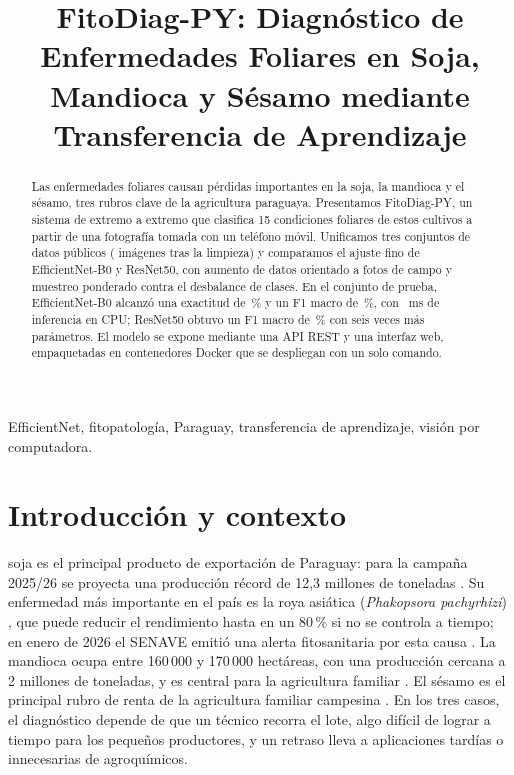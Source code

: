 \documentclass[conference]{IEEEtran}
\begin{document}
\title{FitoDiag-PY: Diagn\'ostico de Enfermedades Foliares en Soja, Mandioca y S\'esamo mediante Transferencia de Aprendizaje}

\author{
}

\maketitle

\begin{abstract}
Las enfermedades foliares causan p\'erdidas importantes en la soja, la mandioca y el s\'esamo, tres rubros clave de la agricultura paraguaya. Presentamos FitoDiag-PY, un sistema de extremo a extremo que clasifica 15 condiciones foliares de estos cultivos a partir de una fotograf\'ia tomada con un tel\'efono m\'ovil. Unificamos tres conjuntos de datos p\'ublicos (\dsKept{} im\'agenes tras la limpieza) y comparamos el ajuste fino de EfficientNet-B0 y ResNet50, con aumento de datos orientado a fotos de campo y muestreo ponderado contra el desbalance de clases. En el conjunto de prueba, EfficientNet-B0 alcanz\'o una exactitud de \effAcc\,\% y un F1 macro de \effFone\,\%, con \effMs~ms de inferencia en CPU; ResNet50 obtuvo un F1 macro de \resFone\,\% con seis veces m\'as par\'ametros. El modelo se expone mediante una API REST y una interfaz web, empaquetadas en contenedores Docker que se despliegan con un solo comando.
\end{abstract}

\begin{IEEEkeywords}
EfficientNet, fitopatolog\'ia, Paraguay, transferencia de aprendizaje, visi\'on por computadora.
\end{IEEEkeywords}

\section{Introducci\'on y contexto}

 soja es el principal producto de exportaci\'on de Paraguay: para la campa\~na 2025/26 se proyecta una producci\'on r\'ecord de 12,3 millones de toneladas \cite{lanacion2026soja}. Su enfermedad m\'as importante en el pa\'is es la roya asi\'atica (\textit{Phakopsora pachyrhizi}) \cite{enciso2021roya}, que puede reducir el rendimiento hasta en un 80\,\% si no se controla a tiempo; en enero de 2026 el SENAVE emiti\'o una alerta fitosanitaria por esta causa \cite{lanacion2026roya}. La mandioca ocupa entre 160\,000 y 170\,000 hect\'areas, con una producci\'on cercana a 2 millones de toneladas, y es central para la agricultura familiar \cite{ultimahora2026mandioca}. El s\'esamo es el principal rubro de renta de la agricultura familiar campesina \cite{lanacion2024sesamo}. En los tres casos, el diagn\'ostico depende de que un t\'ecnico recorra el lote, algo dif\'icil de lograr a tiempo para los peque\~nos productores, y un retraso lleva a aplicaciones tard\'ias o innecesarias de agroqu\'imicos.
\end{document}

